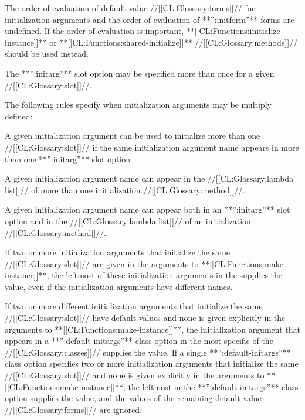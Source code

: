 The order of evaluation of default value //[[CL:Glossary:forms]]// for initialization
arguments and the order of evaluation of **'':initform''** forms are
undefined.  If the order of evaluation is important, 
**[[CL:Functions:initialize-instance]]** or **[[CL:Functions:shared-initialize]]** //[[CL:Glossary:methods]]// 
should be used
instead.

\endsubsection%

     
The **'':initarg''** slot option may be specified more than
once for a given //[[CL:Glossary:slot]]//.

The following rules specify when initialization arguments may be
multiply defined:

\beginlist

\itemitem{\bull} A given initialization argument can be used to
initialize more than one //[[CL:Glossary:slot]]// if the same initialization argument name
appears in more than one **'':initarg''** slot option.

\itemitem{\bull} A given initialization argument name can appear 
in the //[[CL:Glossary:lambda list]]// of more than one initialization //[[CL:Glossary:method]]//.

\itemitem{\bull} A given initialization argument name can
appear both in an **'':initarg''** slot option and 
in the //[[CL:Glossary:lambda list]]//
of an initialization //[[CL:Glossary:method]]//.

\endlist


If two or more initialization arguments that initialize the same
//[[CL:Glossary:slot]]// are given in the arguments to **[[CL:Functions:make-instance]]**, the
leftmost of these initialization arguments in the  supplies the value, even if the initialization arguments
have different names.

If two or more different initialization arguments that initialize the
same //[[CL:Glossary:slot]]// have default values and none is given explicitly in the
arguments to **[[CL:Functions:make-instance]]**, the initialization argument that
appears in a **'':default-initargs''** class option in the most specific
of the //[[CL:Glossary:classes]]// supplies the value. If a single
**'':default-initargs''** class option specifies two or more initialization
arguments that initialize the same //[[CL:Glossary:slot]]// and none is given
explicitly in the arguments to **[[CL:Functions:make-instance]]**, the leftmost in
the **'':default-initargs''** class option supplies the value, and the
values of the remaining default value //[[CL:Glossary:forms]]// are ignored.

